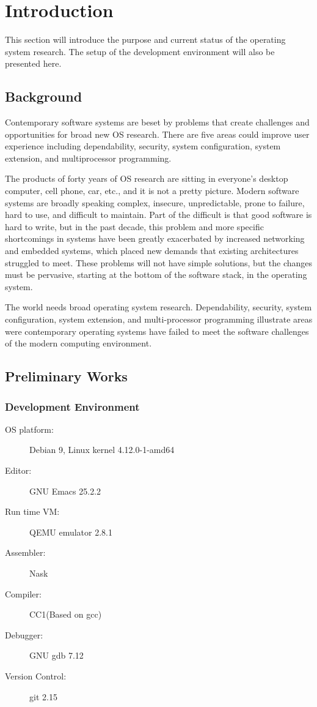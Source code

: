 \documentclass{swfcthesis}
\begin{document}
\mainmatter{}

\chapter{Introduction}
This section will introduce the purpose and current status of the operating system
research. The setup of the development environment will also be presented here.


\section{Background}

Contemporary software systems are beset by problems that create challenges and
opportunities for broad new OS research. There are five areas could improve user
experience including dependability, security, system configuration, system extension, and
multiprocessor programming.

The products of forty years of OS research are sitting in everyone's desktop computer,
cell phone, car, etc., and it is not a pretty picture.  Modern software systems are
broadly speaking complex, insecure, unpredictable, prone to failure, hard to use, and
difficult to maintain. Part of the difficult is that good software is hard to write, but
in the past decade, this problem and more specific shortcomings in systems have been
greatly exacerbated by increased networking and embedded systems, which placed new demands
that existing architectures struggled to meet. These problems will not have simple
solutions, but the changes must be pervasive, starting at the bottom of the software
stack, in the operating system.

The world needs broad operating system research. Dependability, security, system
configuration, system extension, and multi-processor programming illustrate areas were
contemporary operating systems have failed to meet the software challenges of the modern
computing environment\cite{hunt2005broad}.


\section{Preliminary Works}

\subsection{Development Environment}

\begin{description}
\item[OS platform:] Debian 9, Linux kernel 4.12.0-1-amd64
\item[Editor:] GNU Emacs 25.2.2
\item[Run time VM:] QEMU emulator 2.8.1
\item[Assembler:] Nask
\item[Compiler:] CC1(Based on gcc)
\item[Debugger:] GNU gdb 7.12
\item[Version Control:] git 2.15
\end{description}
\end{document}
